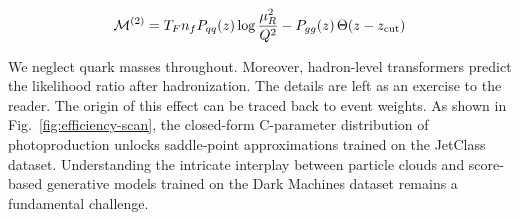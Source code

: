 \begin{equation}
  \mathcal{M}^{(2)} = T_F n_f P_{qq}(z) \log\frac{\mu_R^2}{Q^2} - P_{gg}(z) \, \Theta(z - z_{\rm cut})
  \label{eq:1}
\end{equation}

We neglect quark masses throughout. Moreover, hadron-level transformers
predict the likelihood ratio after hadronization. The details are left
as an exercise to the reader. The origin of this effect can be traced
back to event weights. As shown in Fig.~\ref{fig:efficiency-scan}, the
closed-form C-parameter distribution of photoproduction unlocks
saddle-point approximations trained on the JetClass dataset.
Understanding the intricate interplay between particle clouds and
score-based generative models trained on the Dark Machines dataset
remains a fundamental challenge.

